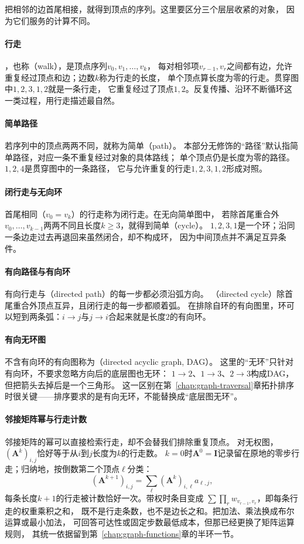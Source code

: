 把相邻的边首尾相接，就得到顶点的序列。这里要区分三个层层收紧的对象，
因为它们服务的计算不同。

\paragraph{行走}
，也称（walk），是顶点序列$v_0,v_1,\ldots,v_k$，
每对相邻项$v_{r-1},v_r$之间都有边，允许重复经过顶点和边；边数$k$称为行走的长度，
单个顶点算长度为零的行走。贯穿图中$1,2,3,1,2$就是一条行走，
它重复经过了顶点$1,2$。反复传播、沿环不断循环这一类过程，用行走描述最自然。

\paragraph{简单路径}
若序列中的顶点两两不同，就称为简单（path）。
本部分无修饰的“路径”默认指简单路径，对应一条不重复经过对象的具体路线；
单个顶点仍是长度为零的路径。$1,2,4$是贯穿图中的一条路径，
它与允许重复的行走$1,2,3,1,2$形成对照。

\paragraph{闭行走与无向环}
首尾相同（$v_0=v_k$）的行走称为闭行走。在无向简单图中，
若除首尾重合外$v_0,\ldots,v_{k-1}$两两不同且长度$k\geq3$，就得到简单（cycle）。
$1,2,3,1$是一个环；沿同一条边走过去再退回来虽然闭合，却不构成环，
因为中间顶点并不满足互异条件。

\paragraph{有向路径与有向环}
有向行走与（directed path）的每一步都必须沿弧方向。
（directed cycle）除首尾重合外顶点互异，且闭行走的每一步都顺着弧。
在排除自环的有向图里，环可以短到两条弧：$i\to j$与$j\to i$合起来就是长度$2$的有向环。

\paragraph{有向无环图}
不含有向环的有向图称为（directed acyclic graph, DAG）。
这里的“无环”只针对有向环，不要求忽略方向后的底层图也无环：
$1\to2$、$1\to3$、$2\to3$构成DAG，但把箭头去掉后是一个三角形。
这一区别在第~\ref{chap:graph-traversal}章拓扑排序时很关键——排序要求的是有向无环，不能替换成“底层图无环”。

\paragraph{邻接矩阵幂与行走计数}
邻接矩阵的幂可以直接检索行走，却不会替我们排除重复顶点。
对无权图，$(\bm A^k)_{i,j}$恰好等于从$i$到$j$长度为$k$的行走数。
$k=0$时$\bm A^0=\bm I$记录留在原地的零步行走；归纳地，按倒数第二个顶点$\ell$分类：
\[
  (\bm A^{k+1})_{i,j}=\sum_\ell(\bm A^k)_{i,\ell}a_{\ell,j},
\]
每条长度$k+1$的行走被计数恰好一次。带权时条目变成
$\sum\prod_r w_{v_{r-1},v_r}$，即每条行走的权重乘积之和，
既不是行走条数，也不是边长之和。把加法、乘法换成布尔运算或最小加法，
可回答可达性或固定步数最低成本，但那已经更换了矩阵运算规则，
其统一依据留到第~\ref{chap:graph-functions}章的半环一节。

